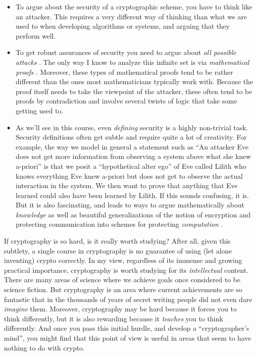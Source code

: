 \begin{itemize}
\item
  To argue about the security of a cryptographic scheme, you have to
  think like an attacker. This requires a very different way of thinking
  than what we are used to when developing algorithms or systems, and
  arguing that they perform well.
\item
  To get robust assurances of security you need to argue about \emph{all
  possible attacks} . The only way I know to analyze this infinite set
  is via \emph{mathematical proofs} . Moreover, these types of
  mathematical proofs tend to be rather different than the ones most
  mathematicians typically work with. Because the proof itself needs to
  take the viewpoint of the attacker, these often tend to be proofs by
  contradiction and involve several twists of logic that take some
  getting used to.
\item
  As we'll see in this course, even \emph{defining} security is a highly
  non-trivial task. Security definitions often get subtle and require
  quite a lot of creativity. For example, the way we model in general a
  statement such as ``An attacker Eve does not get more information from
  observing a system above what she knew a-priori'' is that we posit a
  ``hypothetical alter ego'' of Eve called Lilith who knows everything
  Eve knew a-priori but does not get to observe the actual interaction
  in the system. We then want to prove that anything that Eve learned
  could also have been learned by Lilith. If this sounds confusing, it
  is. But it is also fascinating, and leads to ways to argue
  mathematically about \emph{knowledge} as well as beautiful
  generalizations of the notion of encryption and protecting
  communication into schemes for protecting \emph{computation} .
\end{itemize}

If cryptography is so hard, is it really worth studying? After all,
given this subtlety, a single course in cryptography is no guarantee of
using (let alone inventing) crypto correctly. In my view, regardless of
its immense and growing practical importance, cryptography is worth
studying for its \emph{intellectual} content. There are many areas of
science where we achieve goals once considered to be science fiction.
But cryptography is an area where current achievements are so fantastic
that in the thousands of years of secret writing people did not even
dare \emph{imagine} them. Moreover, cryptography may be hard because it
forces you to think differently, but it is also rewarding because it
\emph{teaches} you to think differently. And once you pass this initial
hurdle, and develop a ``cryptographer's mind'', you might find that this
point of view is useful in areas that seem to have nothing to do with
crypto.
